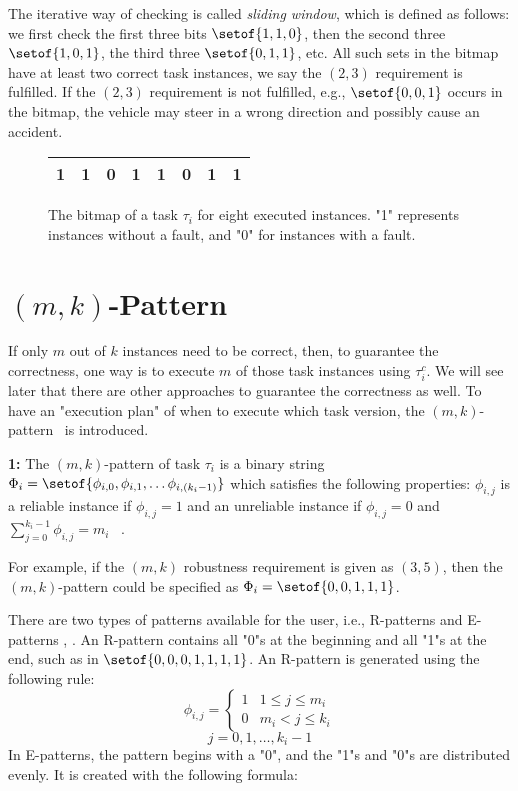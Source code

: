 The iterative way of checking is called \textit{sliding window}, which is defined as follows: we first check the first three bits $\setof{1,1,0}$, then the second three $\setof{1,0,1}$, the third three $\setof{0,1,1}$, etc. All such sets in the bitmap have at least two correct task instances, we say the $(2,3)$ requirement is fulfilled. If the $(2,3)$ requirement is not fulfilled, e.g., $\setof{0,0,1}$ occurs in the bitmap, the vehicle may steer in a wrong direction and possibly cause an accident.

\begin{figure}[h]
\centering
\large
\begin{tabular}{|llllllll|}
\hline

1 & 1 & 0 & 1 & 1 & 0 & 1 & 1  \\ \hline
\end{tabular}
\caption{The bitmap of a task $\tau_i$ for eight executed instances. "1" represents instances without a fault, and "0" for instances with a fault.}
\label{tab:recentexe}
\vspace*{-3mm}
\end{figure}

\section{$(m,k)$-Pattern}
If only $m$ out of $k$ instances need to be correct, then, to guarantee the correctness, one way is to execute $m$ of those task instances using $\tau^c_i$. We will see later that there are other approaches to guarantee the correctness as well.
To have an "execution plan" of when to execute which task version, the $(m,k)$-pattern~\cite{Quan:2000:EFS:1890629.1890640,1661621} is introduced.  
\begin{definition}{\textbf{1:}}
The $(m,k)$-pattern of task $\tau_i$ is a binary string $\Phi_i = \setof{\phi_{i,0},\phi_{i,1},\ldots\phi_{i,(k_i-1)}}$ which satisfies the following properties: $\phi_{i,j}$ is a reliable instance if $\phi_{i,j}=1$ and an unreliable instance if $\phi_{i,j} = 0$ and $\sum^{k_i-1}_{j=0} \phi_{i,j} = m_i$ ~\cite{Chen2016}.
\end{definition}
For example, if the $(m,k)$ robustness requirement is given as $(3,5)$, then the $(m,k)$-pattern could be specified as $\Phi_i = \setof{0,0,1,1,1}$. 

There are two types of patterns available for the user, i.e., R-patterns and E-patterns \cite{1661621}, \cite{Quan:2000:EFS:1890629.1890640}. An R-pattern contains all "0"s at the beginning and all "1"s at the end, such as in $\setof{0,0,0,1,1,1,1}$. An R-pattern is generated using the following rule:
\[
\phi_{i,j} = 
  \begin{cases} 
   1 & 1 \leq j \leq m_i \\
   0 & m_i < j \leq k_i 
  \end{cases} 
\]
\vspace{-0.5cm}
\[
j=0,1,\dots,k_i - 1
\]
In E-patterns, the pattern begins with a "0", and the "1"s and "0"s are distributed evenly. It is created with the following formula:

